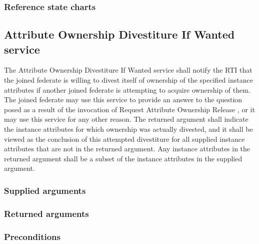 \begin{compactstdpage}

    \subsubsection{Reference state charts}



    \subsection{Attribute Ownership Divestiture If Wanted service}


    The Attribute Ownership Divestiture If Wanted service shall notify the RTI that the joined federate is willing to divest itself of ownership of the specified instance attributes if another joined federate is attempting to acquire ownership of them. The joined federate may use this service to provide an answer to the question posed as a result of the invocation of Request Attribute Ownership Release \rtiinitiated{}, or it may use this service for any other reason. The returned argument shall indicate the instance attributes for which ownership was actually divested, and it shall be viewed as the conclusion of this attempted divestiture for all supplied instance attributes that are not in the returned argument. Any instance attributes in the returned argument shall be a subset of the instance attributes in the supplied argument.

    \subsubsection{Supplied arguments}



    \subsubsection{Returned arguments}



    \subsubsection{Preconditions}



\end{compactstdpage}
